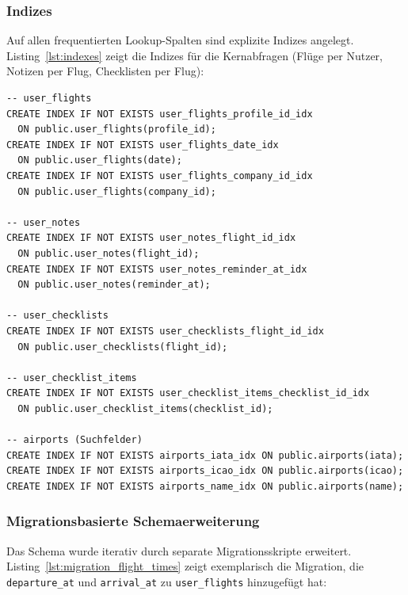 \subsubsection*{Indizes}

Auf allen frequentierten Lookup-Spalten sind explizite Indizes angelegt.
Listing~\ref{lst:indexes} zeigt die Indizes für die Kernabfragen
(Flüge per Nutzer, Notizen per Flug, Checklisten per Flug):

\begin{lstlisting}[style=skyline-sql,
  caption={Performance-Indizes auf den Kerntabellen
           (complete\_working\_schema.sql)},
  label={lst:indexes}]
-- user_flights
CREATE INDEX IF NOT EXISTS user_flights_profile_id_idx
  ON public.user_flights(profile_id);
CREATE INDEX IF NOT EXISTS user_flights_date_idx
  ON public.user_flights(date);
CREATE INDEX IF NOT EXISTS user_flights_company_id_idx
  ON public.user_flights(company_id);

-- user_notes
CREATE INDEX IF NOT EXISTS user_notes_flight_id_idx
  ON public.user_notes(flight_id);
CREATE INDEX IF NOT EXISTS user_notes_reminder_at_idx
  ON public.user_notes(reminder_at);

-- user_checklists
CREATE INDEX IF NOT EXISTS user_checklists_flight_id_idx
  ON public.user_checklists(flight_id);

-- user_checklist_items
CREATE INDEX IF NOT EXISTS user_checklist_items_checklist_id_idx
  ON public.user_checklist_items(checklist_id);

-- airports (Suchfelder)
CREATE INDEX IF NOT EXISTS airports_iata_idx ON public.airports(iata);
CREATE INDEX IF NOT EXISTS airports_icao_idx ON public.airports(icao);
CREATE INDEX IF NOT EXISTS airports_name_idx ON public.airports(name);
\end{lstlisting}

\subsubsection*{Migrationsbasierte Schemaerweiterung}

Das Schema wurde iterativ durch separate Migrationsskripte erweitert.
Listing~\ref{lst:migration_flight_times} zeigt exemplarisch die Migration,
die \texttt{departure\_at} und \texttt{arrival\_at} zu \texttt{user\_flights}
hinzugefügt hat:

